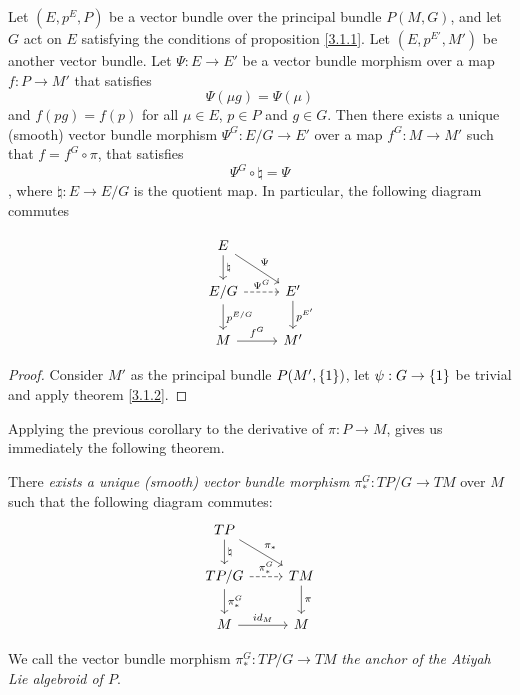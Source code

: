\begin{corollary}
Let $(E, p^E, P)$ be a vector bundle over the principal bundle $P(M, G)$, and let $G$ act on $E$ satisfying the conditions of proposition \ref{3.1.1}. Let $(E, p^{E'}, M')$ be another vector bundle. Let $\Psi: E \to E'$ be a vector bundle morphism over a map $f: P \to M'$ that satisfies \[\Psi(\mu g) = \Psi(\mu)\] and $f(pg) = f(p)$ for all $\mu \in E$, $p \in P$ and $g \in G$. Then there exists a unique (smooth) vector bundle morphism $\Psi^{G}: E/G \to E'$ over a map $f^{G}: M \to M'$ such that $f = f^{G} \circ \pi$, that satisfies \[\Psi^{G} \circ \natural = \Psi\], where $\natural: E \to E/G$ is the quotient map. In particular, the following diagram commutes

\begin{equation} \label{anchorDiagram}
    \begin{tikzcd}
    E \arrow[]{d}{\natural} \arrow[]{dr}{\Psi}& \\
    E/G \arrow[dashed]{r}{\Psi^{G}} \arrow[]{d}{p^{E/G}}& E' \arrow[]{d}{p^{E'}} \\
    M \arrow[]{r}{f^{G}} & M'
    \end{tikzcd}
\end{equation}
\end{corollary}

\begin{proof}
Consider $M'$ as the principal bundle $P(M', \left\{ 1 \right\})$, let $\psi:G \to \left\{ 1 \right\}$ be trivial and apply theorem \ref{3.1.2}.
\end{proof}

Applying the previous corollary to the derivative of $\pi: P \to M$, gives us immediately the following theorem.

\begin{theorem}\label{anchorAtiyah}
There \emph{exists a unique (smooth) vector bundle morphism} $\pi_*^G: TP/G \to TM$ over $M$ such that the following diagram commutes:
\begin{equation} \label{anchorDiagram}
    \begin{tikzcd}
    TP \arrow[]{d}{\natural} \arrow[]{dr}{\pi_*}& \\
    TP/G \arrow[dashed]{r}{\pi^G_*} \arrow[]{d}{\pi_*^G}& TM \arrow[]{d}{\pi} \\
    M \arrow[]{r}{id_M} & M
    \end{tikzcd}
\end{equation}

We call the vector bundle morphism $\pi^G_*:TP/G \to TM$ \emph{the anchor of the Atiyah Lie algebroid of $P$}.
\end{theorem}

